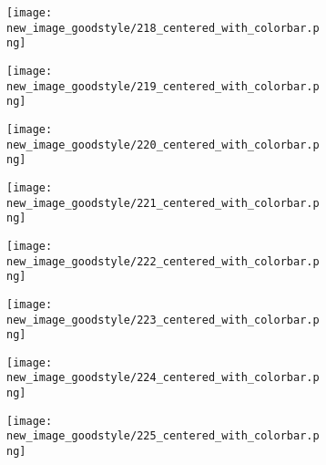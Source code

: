 \documentclass[a4paper,12pt]{article}
\begin{document}
\begin{figure}[H]
  \begin{subfigure}{0.11\textwidth}
    \texttt{[image: new\_image\_goodstyle/218\_centered\_with\_colorbar.png]}
  \end{subfigure}
  \hfill
  \begin{subfigure}{0.11\textwidth}
    \texttt{[image: new\_image\_goodstyle/219\_centered\_with\_colorbar.png]}
  \end{subfigure}
  \hfill
  \begin{subfigure}{0.11\textwidth}
    \texttt{[image: new\_image\_goodstyle/220\_centered\_with\_colorbar.png]}
  \end{subfigure}
  \hfill
  \begin{subfigure}{0.11\textwidth}
    \texttt{[image: new\_image\_goodstyle/221\_centered\_with\_colorbar.png]}
  \end{subfigure}
  \hfill
  \begin{subfigure}{0.11\textwidth}
    \texttt{[image: new\_image\_goodstyle/222\_centered\_with\_colorbar.png]}
  \end{subfigure}
  \hfill
  \begin{subfigure}{0.11\textwidth}
    \texttt{[image: new\_image\_goodstyle/223\_centered\_with\_colorbar.png]}
  \end{subfigure}
  \hfill
  \begin{subfigure}{0.11\textwidth}
    \texttt{[image: new\_image\_goodstyle/224\_centered\_with\_colorbar.png]}
  \end{subfigure}
  \hfill
  \begin{subfigure}{0.11\textwidth}
    \texttt{[image: new\_image\_goodstyle/225\_centered\_with\_colorbar.png]}
  \end{subfigure}
  \hfill
\end{figure}
\end{document}
